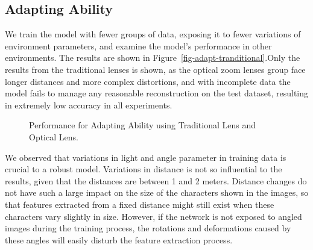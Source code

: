 \subsection{Adapting Ability}
We train the model with fewer groups of data, exposing it to fewer variations of environment parameters, and examine the model’s performance in other environments. The results are shown in Figure~\ref{fig-adapt-tranditional}.Only the results from the traditional lenses is shown, as the optical zoom lenses group face longer distances and more complex distortions, and with incomplete data the model fails to manage any reasonable reconstruction on the test dataset, resulting in extremely low accuracy in all experiments.
\begin{figure}[!t]
    \centering
    \hfill
    \caption{Performance for Adapting Ability using Traditional Lens and Optical Lens.}
    \label{fig:adapting}
\end{figure}

We observed that variations in light and angle parameter in training data is crucial to a robust model. Variations in distance is not so influential to the results, given that the distances are between 1 and 2 meters. Distance changes do not have such a large impact on the size of the characters shown in the images, so that features extracted from a fixed distance might still exist when these characters vary slightly in size. However, if the network is not exposed to angled images during the training process, the rotations and deformations caused by these angles will easily disturb the feature extraction process.


